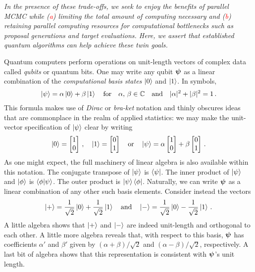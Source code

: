 \documentclass[12pt]{article} %
\begin{document}
\emph{In the presence of these trade-offs, we seek to enjoy the benefits of parallel MCMC while (\textcolor{red}{a}) limiting the total amount of computing necessary and (\textcolor{red}{b})  retaining parallel computing resources for computational bottlenecks such as proposal generations and target evaluations. Here, we assert that established quantum algorithms can help achieve these twin goals.}

Quantum computers perform operations on unit-length vectors of complex data called \emph{qubits} or quantum bits.  One may write any qubit $\boldsymbol{\psi}$ as a linear combination of the \emph{computational basis states} $\ket{0}$ and $\ket{1}$.  In symbols,
\begin{align*}
\ket{\psi} = \alpha \ket{0} + \beta \ket{1} \quad \mbox{for} \quad \alpha, \, \beta \in \mathbb{C} \quad \mbox{and} \quad  |\alpha|^2 + |\beta|^2 = 1\, .
\end{align*}
This formula makes use of \emph{Dirac} or \emph{bra-ket} notation and thinly obscures ideas that are commonplace in the realm of applied statistics: we may make the unit-vector specification of $\ket{\psi}$ clear by writing
\begin{align*}
\ket{0}=\begin{bmatrix}
1 \\ 0
\end{bmatrix} \, ,  \quad \ket{1}=\begin{bmatrix}
0 \\ 1
\end{bmatrix} \quad \mbox{or} \quad \ket{\psi} = \alpha \begin{bmatrix}
1 \\ 0
\end{bmatrix} + \beta  \begin{bmatrix}
0 \\ 1
\end{bmatrix}\, .
\end{align*} 
As one might expect, the full machinery of linear algebra is also available within this notation. The conjugate transpose of $\ket{\psi}$ is $\bra{\psi}$. The inner product of $\ket{\psi}$ and $\ket{\phi}$ is $\braket{\phi|\psi}$. The outer product is $\ket{\psi}\bra{\phi}$. Naturally, we can write $\boldsymbol{\psi}$ as a linear combination of any other such basis elements. Consider instead the vectors
\begin{align*}
\ket{+} = \frac{1}{\sqrt{2}} \ket{0} + \frac{1}{\sqrt{2}} \ket{1} \quad \mbox{and} \quad \ket{-} = \frac{1}{\sqrt{2}} \ket{0} - \frac{1}{\sqrt{2}} \ket{1} \, .
\end{align*}
A little algebra shows that $\ket{+}$ and $\ket{-}$ are indeed unit-length and orthogonal to each other. A little more algebra reveals that, with respect to this basis, $\boldsymbol{\psi}$ has coefficients $\alpha'$ and $\beta'$ given by $(\alpha + \beta)/\sqrt{2}$ and $(\alpha - \beta)/\sqrt{2}$, respectively. A last bit of algebra shows that this representation is consistent with $\boldsymbol{\psi}$'s unit length.
\end{document}
